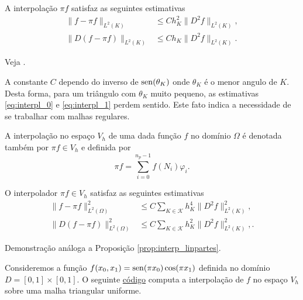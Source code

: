 \begin{prop}\label{prop:interpl}
  A interpolação $\pi f$ satisfaz as seguintes estimativas
  \begin{align}
    \|f - \pi f\|_{L^2(K)} &\leq Ch_K^2\|D^2f\|_{L^2(K)},\label{eq:interpl_0}\\
    \|D(f - \pi f)\|_{L^2(K)} &\leq Ch_K\|D^2 f\|_{L^2(K)}.\label{eq:interpl_1}
  \end{align}
\end{prop}
\begin{dem}
  Veja \cite[Capítulo 4]{Brenner2008a}.
\end{dem}

\begin{obs}
  A constante $C$ dependo do inverso de $\operatorname{sen}(\theta_K)$ onde $\theta_K$ é o menor angulo de $K$. Desta forma, para um triângulo com $\theta_K$ muito pequeno, as estimativas \eqref{eq:interpl_0} e \eqref{eq:interpl_1} perdem sentido. Este fato indica a necessidade de se trabalhar com malhas regulares.
\end{obs}

A interpolação no espaço $V_h$ de uma dada função $f$ no domínio $\Omega$ é denotada também por $\pi f\in V_h$ e definida por
\begin{equation}
  \pi f = \sum_{i=0}^{n_p-1} f(N_i)\varphi_i.
\end{equation}

\begin{prop}\label{prop:interpc}
  O interpolador $\pi f\in V_h$ satisfaz as seguintes estimativas
  \begin{align}
    \|f - \pi f\|_{L^2(\Omega)}^2 &\leq C\sum_{K\in\mathcal{K}} h_K^4\|D^2 f\|_{L^2(K)}^2,\label{eq:interpc_0}\\
    \|D(f - \pi f)\|_{L^2(\Omega)}^2 &\leq C\sum_{K\in\mathcal{K}} h_K^2\|D^2 f\|_{L^2(K)}^2,\label{eq:interpc_1}.
  \end{align}
\end{prop}
\begin{dem}
  Demonstração análoga a Proposição \ref{prop:interp_linpartes}.
\end{dem}

\ifispython
\begin{ex}\label{ex:interp}
Consideremos a função $f(x_0,x_1) = \operatorname{sen}(\pi x_0)\cos(\pi x_1)$ definida no domínio $D = [0, 1]\times [0, 1]$. O seguinte \href{https://github.com/phkonzen/notas/blob/master/src/MetodoElementosFinitos/cap_mef2d/dados/ex_interp/ex_interp.py}{código} computa a interpolação de $f$ no espaço $V_h$ sobre uma malha triangular uniforme.


\end{ex}
\fi

